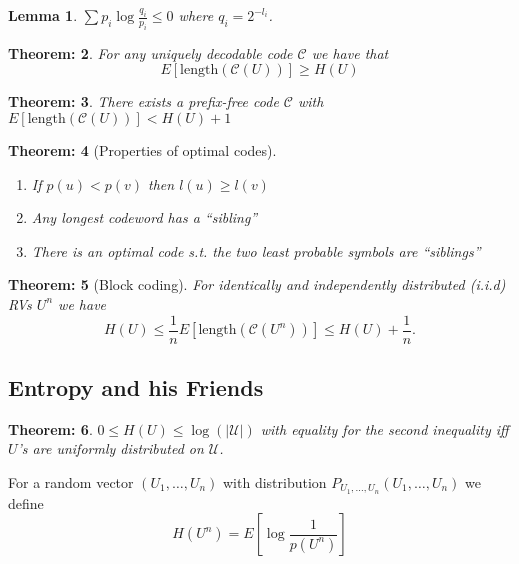 \documentclass[11pt, a4paper]{scrartcl}
\newtheorem{theorem}{Theorem:}[section]
\newtheorem{lemma}[theorem]{Lemma}
\newenvironment{definition}[1][Definition]{\begin{trivlist}
\item[\hskip \labelsep {\bfseries #1}]}{\end{trivlist}}
\begin{document}
\begin{lemma}
 $\sum p_i \log \frac{q_i}{p_i} \leq 0$ where $q_i=2^{-l_i}$.
\end{lemma}

\begin{theorem}
For any uniquely decodable code $\mathcal{C}$ we have that
$$E[\text{length}(\mathcal{C}(U))]\geq H(U)$$
\end{theorem}

\begin{theorem}
There exists a prefix-free code $\mathcal{C}$ with
$E[\text{length}(\mathcal{C}(U))]< H(U) + 1$
\end{theorem}

\begin{theorem} [Properties of optimal codes]
  \begin{enumerate}
  \item If $p(u)<p(v)$ then $l(u)\geq l(v)$
\item Any longest codeword has a ``sibling''
\item There is an optimal code s.t. the two least probable symbols
  are ``siblings''
  \end{enumerate}
\end{theorem}

\begin{theorem} [Block coding]
For identically and independently distributed (i.i.d) RVs $U^n$ we
have $$H(U)\leq \frac{1}{n}E[\text{length}(\mathcal{C}(U^n))]\leq
H(U)+ \frac{1}{n}.$$
\end{theorem}

\subsection{Entropy and his Friends}
\begin{theorem}
$0\leq H(U) \leq \log(|\mathcal{U}|)$ with equality for the second
inequality iff $U$'s are uniformly distributed on $\mathcal U$.
\end{theorem}


\begin{definition}
For a random vector $(U_1,\dots, U_n)$ with distribution
$P_{U_1,\dots,U_n}(U_1,\dots, U_n)$ we define $$H(U^n)=E\left[\log
  \frac{1}{p(U^n)}\right]$$
\end{definition}
\end{document}
